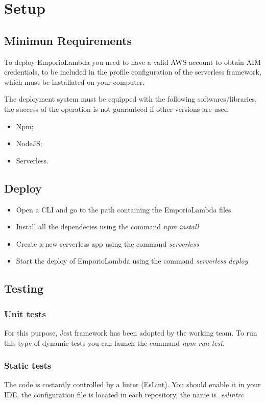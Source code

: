 \section{Setup}

\subsection{Minimun Requirements}
To deploy EmporioLambda you need to have a valid AWS account to obtain AIM credentials, to be included in the profile configuration of 
the serverless framework, which must be installated on your computer.

The deployment system must be equipped with the following softwares/libraries, the success of the operation is not guaranteed if other versions are used


\begin{itemize}
    \item Npm;
    \item NodeJS;
    \item Serverless.
\end{itemize}

\subsection{Deploy}

\begin{itemize}
    \item Open a CLI and go to the path containing the EmporioLambda files.
    \item Install all the dependecies using the command \textit{npm install}
    \item Create a new serverless app using the command \textit{serverless}
    \item Start the deploy of EmporioLambda using the command \textit{serverless deploy}
\end{itemize}

\subsection{Testing}

\subsubsection{Unit tests}
For this purpose, Jest framework has been adopted by the working team. To run this type of dynamic tests
you can launch the command \textit{npm run test}.

\subsubsection{Static tests}
The code is costantly controlled by a linter (EsLint). You should enable it in your IDE, the configuration file is
located in each repository, the name is \textit{.eslintrc}